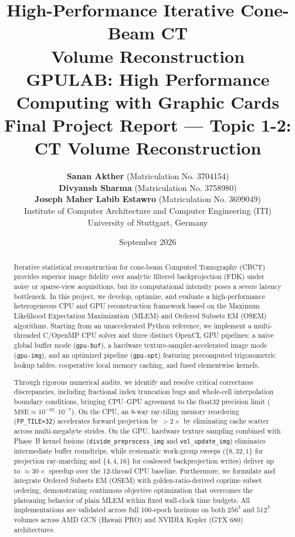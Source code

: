 \documentclass[11pt,a4paper]{article}
\title{
  \vspace{-1.5cm}
  {\Huge\textbf{\color{primary}High-Performance Iterative Cone-Beam CT}}\\[0.3em]
  {\Huge\textbf{\color{primary}Volume Reconstruction}}\\[0.5em]
  {\large\textbf{\color{darkslate}GPULAB: High Performance Computing with Graphic Cards}}\\[0.2em]
  {\normalsize\color{gray}Final Project Report — Topic 1-2: CT Volume Reconstruction}
  \vspace{-0.3cm}
}
\author{
  \textbf{Sanan Akther} \quad (Matriculation No. 3704154)\\[0.25em]
  \textbf{Divyansh Sharma} \quad (Matriculation No. 3758980)\\[0.25em]
  \textbf{Joseph Maher Labib Estawro} \quad (Matriculation No. 3699049)\\[0.8em]
  \normalsize Institute of Computer Architecture and Computer Engineering (ITI)\\
  \normalsize University of Stuttgart, Germany
}
\date{September 2026}
\begin{document}
\maketitle
\thispagestyle{plain}

\begin{abstract}
\noindent
Iterative statistical reconstruction for cone-beam Computed Tomography (CBCT) provides superior image fidelity over analytic filtered backprojection (FDK) under noisy or sparse-view acquisitions, but its computational intensity poses a severe latency bottleneck. In this project, we develop, optimize, and evaluate a high-performance heterogeneous CPU and GPU reconstruction framework based on the Maximum Likelihood Expectation Maximization (MLEM) and Ordered Subsets EM (OSEM) algorithms. Starting from an unaccelerated Python reference, we implement a multi-threaded C/OpenMP CPU solver and three distinct OpenCL GPU pipelines: a naive global buffer mode (\texttt{gpu-buf}), a hardware texture-sampler-accelerated image mode (\texttt{gpu-img}), and an optimized pipeline (\texttt{gpu-opt}) featuring precomputed trigonometric lookup tables, cooperative local memory caching, and fused elementwise kernels.

Through rigorous numerical audits, we identify and resolve critical correctness discrepancies, including fractional index truncation bugs and whole-cell interpolation boundary conditions, bringing CPU--GPU agreement to the $\text{float32}$ precision limit ($\text{MSE} \approx 10^{-10}\text{--}10^{-7}$). On the CPU, an 8-way ray-tiling memory reordering (\texttt{FP\_TILE=32}) accelerates forward projection by $>2\times$ by eliminating cache scatter across multi-megabyte strides. On the GPU, hardware texture sampling combined with Phase~B kernel fusions (\texttt{divide\_preprocess\_img} and \texttt{vol\_update\_img}) eliminates intermediate buffer roundtrips, while systematic work-group sweeps ($\{8,32,1\}$ for projection ray-marching and $\{4,4,16\}$ for coalesced backprojection writes) deliver up to $\approx 30\times$ speedup over the 12-thread CPU baseline. Furthermore, we formulate and integrate Ordered Subsets EM (OSEM) with golden-ratio-derived coprime subset ordering, demonstrating continuous objective optimization that overcomes the plateauing behavior of plain MLEM within fixed wall-clock time budgets. All implementations are validated across full 100-epoch horizons on both $256^3$ and $512^3$ volumes across AMD GCN (Hawaii PRO) and NVIDIA Kepler (GTX 680) architectures.
\end{abstract}
\end{document}
